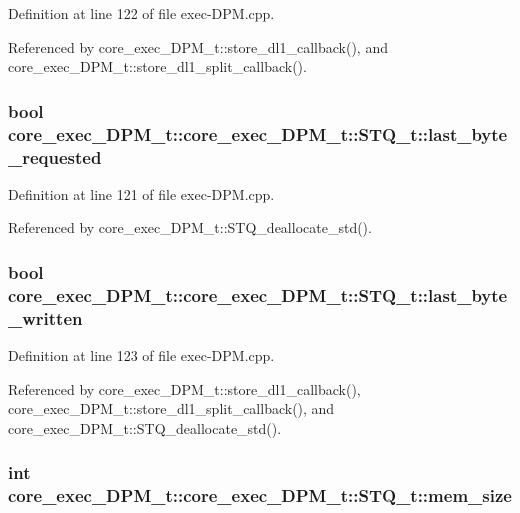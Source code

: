 Definition at line 122 of file exec-DPM.cpp.

Referenced by core\_\-exec\_\-DPM\_\-t::store\_\-dl1\_\-callback(), and core\_\-exec\_\-DPM\_\-t::store\_\-dl1\_\-split\_\-callback().
\subsubsection[{last\_\-byte\_\-requested}]{\setlength{\rightskip}{0pt plus 5cm}bool core\_\-exec\_\-DPM\_\-t::core\_\-exec\_\-DPM\_\-t::STQ\_\-t::last\_\-byte\_\-requested}\label{structcore__exec__DPM__t_1_1STQ__t_6dc334ad05d9160f08b81e1ffa2898ea}




Definition at line 121 of file exec-DPM.cpp.

Referenced by core\_\-exec\_\-DPM\_\-t::STQ\_\-deallocate\_\-std().
\subsubsection[{last\_\-byte\_\-written}]{\setlength{\rightskip}{0pt plus 5cm}bool core\_\-exec\_\-DPM\_\-t::core\_\-exec\_\-DPM\_\-t::STQ\_\-t::last\_\-byte\_\-written}\label{structcore__exec__DPM__t_1_1STQ__t_b7e912e72db5bc04e0c5a1bece119286}




Definition at line 123 of file exec-DPM.cpp.

Referenced by core\_\-exec\_\-DPM\_\-t::store\_\-dl1\_\-callback(), core\_\-exec\_\-DPM\_\-t::store\_\-dl1\_\-split\_\-callback(), and core\_\-exec\_\-DPM\_\-t::STQ\_\-deallocate\_\-std().
\subsubsection[{mem\_\-size}]{\setlength{\rightskip}{0pt plus 5cm}int core\_\-exec\_\-DPM\_\-t::core\_\-exec\_\-DPM\_\-t::STQ\_\-t::mem\_\-size}\label{structcore__exec__DPM__t_1_1STQ__t_b8d2c250122d5b13cb3f6e92fd655372}





